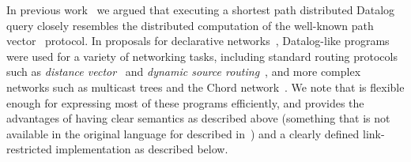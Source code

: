 In previous work~\cite{declareRoute} we argued that executing a shortest path
distributed 
Datalog query closely resembles the distributed computation of the well-known
path vector~\cite{ee122text} protocol.  In proposals for
declarative networks~\cite{declareRoute,declareOverlays}, Datalog-like programs were used
for a variety of networking tasks, including
standard routing protocols such as {\em distance
  vector}~\cite{ee122text} and {\em dynamic source
  routing}~\cite{dsr}, and more complex networks such as multicast trees
and the Chord network~\cite{chord}.  We note that \Dlog is
flexible enough for expressing most of these programs efficiently, and provides the advantages of having clear
semantics as described above (something that is not available in the
original language for \Sys described in~\cite{declareOverlays}) and a clearly defined
link-restricted implementation as described below.





